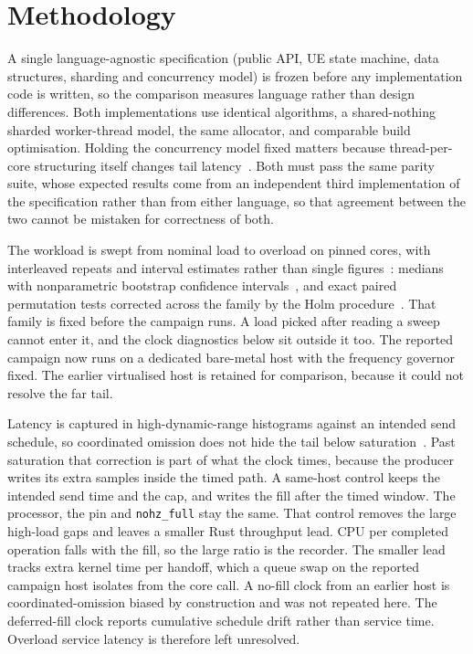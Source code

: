 \documentclass[11pt,a4paper]{article}
\begin{document}
\section{Methodology}

A single language-agnostic specification (public API, UE state machine, data
structures, sharding and concurrency model) is frozen before any implementation
code is written, so the comparison measures language rather than design
differences. Both implementations use identical algorithms, a shared-nothing
sharded worker-thread model, the same allocator, and comparable build
optimisation. Holding the concurrency model fixed matters because
thread-per-core structuring itself changes tail
latency~\cite{enberg2019threadpercore}. Both must pass the same parity suite,
whose expected results come from an independent third implementation of the
specification rather than from either language, so that agreement between the
two cannot be mistaken for correctness of both.

The workload is swept from nominal load to overload on pinned cores, with
interleaved repeats and interval estimates rather than single
figures~\cite{georges2007rigorous}: medians with nonparametric bootstrap
confidence intervals~\cite{efron1993bootstrap}, and exact paired permutation
tests corrected across the family by the Holm procedure~\cite{holm1979simple}.
That family is fixed before the campaign runs. A load picked after reading a
sweep cannot enter it, and the clock diagnostics below sit outside it too.
The reported campaign now runs on a dedicated bare-metal host with the
frequency governor fixed. The earlier virtualised host is retained for
comparison, because it could not resolve the far tail.

Latency is captured in high-dynamic-range histograms against an intended send
schedule, so coordinated omission does not hide the tail below
saturation~\cite{schroeder2006openclosed,tene_hdrhistogram}. Past saturation
that correction is part of what the clock times, because the producer writes
its extra samples inside the timed path. A same-host control keeps the
intended send time and the cap, and writes the fill after the timed window.
The processor, the pin and \texttt{nohz\_full} stay the same. That control
removes the large high-load gaps and leaves a smaller Rust throughput lead.
CPU per completed operation falls with the fill, so the large ratio is the
recorder. The smaller lead tracks extra kernel time per handoff, which a queue
swap on the reported campaign host isolates from the core call. A no-fill clock
from an earlier host is coordinated-omission biased by construction and was
not repeated here. The deferred-fill clock reports cumulative schedule drift
rather than service time. Overload service latency is therefore left unresolved.
\end{document}
